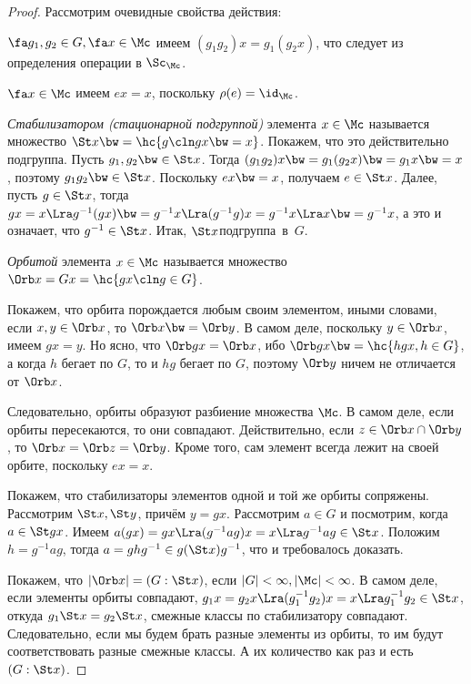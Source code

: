 \documentclass[a4paper]{article}
\begin{document}
\begin{proof}
Рассмотрим очевидные свойства действия:

 $\fa g_1, g_2 \in G, \fa x \in \Mc$ имеем $(g_1g_2)x=g_1(g_2x)$, что  следует из определения операции
в $\Sc_\Mc$.

 $\fa x \in \Mc$ имеем $ex=x$, поскольку $\rho(e) = \id_\Mc$.


\begin{df}
\emph{Стабилизатором (стационарной подгруппой)} элемента $x \in \Mc$ называется множество $\St x \bw=
\hc{g\cln gx\bw=x}$. Покажем, что это действительно подгруппа. Пусть $g_1, g_2 \bw\in \St x$. Тогда
$(g_1g_2)x\bw=g_1(g_2x) \bw= g_1x\bw=x$, поэтому $g_1g_2 \bw\in \St x$. Поскольку $ex\bw=x$, получаем $e \in
\St x$. Далее, пусть $g \in \St x$, тогда $gx=x \Lra g^{-1}(gx)\bw= g^{-1}x \Lra (g^{-1}g)x=g^{-1}x \Lra x \bw=
g^{-1}x$, а это и означает, что $g^{-1} \in \St x$. Итак, $\St x$\т подгруппа~в~$G$.
\end{df}

\begin{df}
\emph{Орбитой} элемента $x \in \Mc$ называется множество $\Orb x = Gx = \hc{gx\cln g \in G}$.
\end{df}

Покажем, что орбита порождается любым своим элементом, иными словами, если  $x, y \in \Orb x$, то $\Orb
x\bw=\Orb y$. В самом деле, поскольку $y \in \Orb x$, имеем $gx=y$. Но ясно, что $\Orb gx = \Orb x$, ибо $\Orb
gx \bw= \hc{hgx, h \in G}$, а когда $h$ бегает по $G$, то и $hg$ бегает по $G$, поэтому $\Orb y$ ничем не
отличается от $\Orb x$.

Следовательно, орбиты образуют разбиение множества $\Mc$. В самом деле, если  орбиты пересекаются, то они
совпадают. Действительно, если $z\in\Orb x \cap \Orb y$, то $\Orb x=\Orb z=\Orb y$. Кроме того, сам элемент
всегда лежит на своей орбите, поскольку $ex=x$.

Покажем, что стабилизаторы элементов одной и той же орбиты сопряжены. Рассмотрим $\St x, \St y$, причём $y=gx$. Рассмотрим $a \in G$ и посмотрим,
когда $a \in \St gx$. Имеем $a(gx)=gx \Lra (g^{-1}ag)x=x \Lra g^{-1}ag \in \St x$. Положим $h = g^{-1}ag$, тогда $a=ghg^{-1} \in g(\St x)g^{-1}$,
что и требовалось доказать.

Покажем, что $|\Orb x| = (G: \St x)$, если $|G| < \infty, |\Mc| < \infty$. В  самом деле, если элементы
орбиты совпадают,  $g_1x=g_2x \Lra (g_1^{-1}g_2)x=x \Lra g_1^{-1}g_2 \in \St x$, откуда $g_1\St x =
g_2\St x$,  смежные классы по стабилизатору совпадают. Следовательно, если мы будем брать разные элементы
из орбиты, то им будут соответствовать разные смежные классы. А их количество как раз и есть $(G: \St x)$.


\end{proof}
\end{document}
